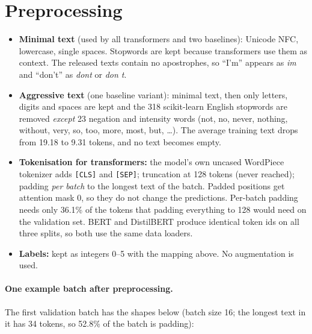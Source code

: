 \documentclass[11pt,a4paper]{article}
\begin{document}
\section{Preprocessing}
\label{sec:prep}
\begin{itemize}
  \item \textbf{Minimal text} (used by all transformers and two baselines): Unicode NFC, lowercase, single spaces. Stopwords are kept because transformers use them as context. The released texts contain no apostrophes, so ``I'm'' appears as \emph{im} and ``don't'' as \emph{dont} or \emph{don t}.
  \item \textbf{Aggressive text} (one baseline variant): minimal text, then only letters, digits and spaces are kept and the 318 scikit-learn English stopwords are removed \emph{except} 23 negation and intensity words (not, no, never, nothing, without, very, so, too, more, most, but, \ldots). The average training text drops from 19.18 to 9.31 tokens, and no text becomes empty.
  \item \textbf{Tokenisation for transformers:} the model's own uncased WordPiece tokenizer adds \texttt{[CLS]} and \texttt{[SEP]}; truncation at 128 tokens (never reached); padding \emph{per batch} to the longest text of the batch. Padded positions get attention mask 0, so they do not change the predictions. Per-batch padding needs only 36.1\% of the tokens that padding everything to 128 would need on the validation set. BERT and DistilBERT produce identical token ids on all three splits, so both use the same data loaders.
  \item \textbf{Labels:} kept as integers 0--5 with the mapping above. No augmentation is used.
\end{itemize}

\paragraph{One example batch after preprocessing.} The first validation batch has the shapes below (batch size 16; the longest text in it has 34 tokens, so 52.8\% of the batch is padding):
\end{document}
